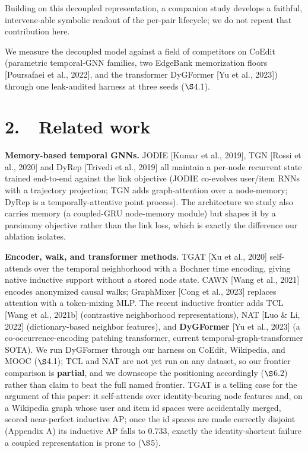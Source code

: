 \documentclass[conference]{IEEEtran}
\begin{document}
Building on this decoupled representation, a companion study develops a faithful, intervene-able symbolic readout of the per-pair lifecycle; we do not repeat that contribution here.

We measure the decoupled model against a field of competitors on CoEdit (parametric temporal-GNN families, two EdgeBank memorization floors [Poursafaei et al., 2022], and the transformer DyGFormer [Yu et al., 2023]) through one leak-audited harness at three seeds ($\S$4.1).

\section*{2.~~Related work}

\textbf{Memory-based temporal GNNs.} JODIE [Kumar et al., 2019], TGN [Rossi et al., 2020] and DyRep [Trivedi et al., 2019] all maintain a per-node recurrent state trained end-to-end against the link objective (JODIE co-evolves user/item RNNs with a trajectory projection; TGN adds graph-attention over a node-memory; DyRep is a temporally-attentive point process). The architecture we study also carries memory (a coupled-GRU node-memory module) but shapes it by a parsimony objective rather than the link loss, which is exactly the difference our ablation isolates.

\textbf{Encoder, walk, and transformer methods.} TGAT [Xu et al., 2020] self-attends over the temporal neighborhood with a Bochner time encoding, giving native inductive support without a stored node state. CAWN [Wang et al., 2021] encodes anonymized causal walks; GraphMixer [Cong et al., 2023] replaces attention with a token-mixing MLP. The recent inductive frontier adds TCL [Wang et al., 2021b] (contrastive neighborhood representations), NAT [Luo \& Li, 2022] (dictionary-based neighbor features), and \textbf{DyGFormer} [Yu et al., 2023] (a co-occurrence-encoding patching transformer, current temporal-graph-transformer SOTA). We run DyGFormer through our harness on CoEdit, Wikipedia, and MOOC ($\S$4.1); TCL and NAT are not yet run on any dataset, so our frontier comparison is \textbf{partial}, and we downscope the positioning accordingly ($\S$6.2) rather than claim to beat the full named frontier. TGAT is a telling case for the argument of this paper: it self-attends over identity-bearing node features and, on a Wikipedia graph whose user and item id spaces were accidentally merged, scored near-perfect inductive AP; once the id spaces are made correctly disjoint (Appendix A) its inductive AP falls to 0.733, exactly the identity-shortcut failure a coupled representation is prone to ($\S$5).
\end{document}
